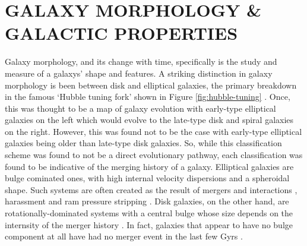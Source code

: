 \section{GALAXY MORPHOLOGY \& GALACTIC PROPERTIES}
\noindent Galaxy morphology, and its change with time, specifically is the study and measure of a galaxys' shape and features. A striking distinction in galaxy morphology is been between disk and elliptical galaxies, the primary breakdown in the famous `Hubble tuning fork' shown in Figure \ref{fig:hubble-tuning} \citep{1936rene.book.....H}. Once, this was thought to be a map of galaxy evolution with early-type elliptical galaxies on the left which would evolve to the late-type disk and spiral galaxies on the right. However, this was found not to be the case with early-type elliptical galaxies being older than late-type disk galaxies. So, while this classification scheme was found to not be a direct evolutionary pathway, each classification was found to be indicative of the merging history of a galaxy. Elliptical galaxies are bulge cominated ones, with high internal velocity dispersions and a spheroidal shape. Such systems are often created as the result of mergers and interactions \citep{Papers on elliptical galaxy creation from mergers}, harassment \citep{Papers on harassement} and ram pressure stripping \citep{Papers on ram pressure stripping}. Disk galaxies, on the other hand, are rotationally-dominated systems with a central bulge whose size depends on the internsity of the merger history \citep{Papers on bulge size matching merger intensity}. In fact, galaxies that appear to have no bulge component at all have had no merger event in the last few Gyrs \citep{2012ApJ...756...26M}.

